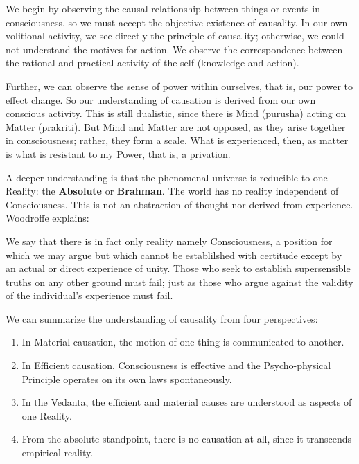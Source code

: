 We begin by observing the causal relationship between things or events in consciousness, so we must accept the objective existence of causality. In our own volitional activity, we see directly the principle of causality; otherwise, we could not understand the motives for action. We observe the correspondence between the rational and practical activity of the self (knowledge and action).

Further, we can observe the sense of power within ourselves, that is, our power to effect change. So our understanding of causation is derived from our own conscious activity. This is still dualistic, since there is Mind (purusha) acting on Matter (prakriti). But Mind and Matter are not opposed, as they arise together in consciousness; rather, they form a scale. What is experienced, then, as matter is what is resistant to my Power, that is, a privation.

A deeper understanding is that the phenomenal universe is reducible to one Reality: the \textbf{Absolute} or \textbf{Brahman}. The world has no reality independent of Consciousness. This is not an abstraction of thought nor derived from experience. Woodroffe explains:

\begin{quotex}
We say that there is in fact only reality namely Consciousness, a position for which we may argue but which cannot be establilshed with certitude except by an actual or direct experience of unity. Those who seek to establish supersensible truths on any other ground must fail; just as those who argue against the validity of the individual's experience must fail.

\end{quotex}
We can summarize the understanding of causality from four perspectives:

\begin{enumerate}
\item In Material causation, the motion of one thing is communicated to another. 
\item In Efficient causation, Consciousness is effective and the Psycho-physical Principle operates on its own laws spontaneously. 
\item In the Vedanta, the efficient and material causes are understood as aspects of one Reality. 
\item From the absolute standpoint, there is no causation at all, since it transcends empirical reality. 
\end{enumerate}


